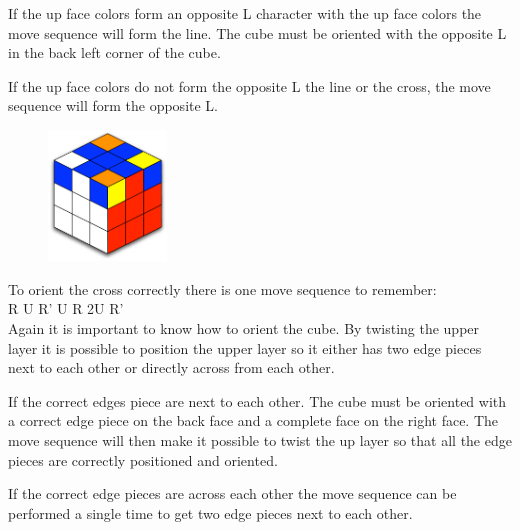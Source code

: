 If the up face colors form an opposite L character with the up face colors the move sequence will form the line. The cube must be oriented with the opposite L in the back left corner of the cube. 

If the up face colors do not form the opposite L the line or the cross, the move sequence will form the opposite L.

\begin{figure}
\begin{center}
	\includegraphics[width=0.28\textwidth]{input/pics/7LLedges.pdf}	
\end{center}
\caption{}
\label{fig:7LLedges}
\end{figure}


To orient the cross correctly there is one move sequence to remember: \\

R U R' U R 2U R' \\

Again it is important to know how to orient the cube. By twisting the upper layer it is possible to position the upper layer so it either has two edge pieces next to each other or directly across from each other.

If the correct edges piece are next to each other. The cube must be oriented with a correct edge piece on the back face and a complete face on the right face. The move sequence will then make it possible to twist the up layer so that all the edge pieces are correctly positioned and oriented.

If the correct edge pieces are across each other the move sequence can be performed a single time to get two edge pieces next to each other.


